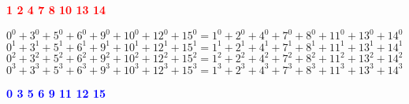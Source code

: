 \documentclass{beamer}
\begin{document}
\begin{frame}
\end{frame}

\begin{frame}
\end{frame}

\begin{frame}
\end{frame}

\begin{frame}
\end{frame}

\begin{frame}

    \begin{center}
    \textcolor{red}{\textbf{1 \hspace{0.5cm} 2 \hspace{0.5cm} 4 \hspace{0.5cm} 7 \hspace{0.5cm} 8 \hspace{0.5cm} 10 \hspace{0.5cm} 13 \hspace{0.5cm} 14}}
    \end{center}
    \vspace{1cm}

    \begin{center}
    $0^0 + 3^0 + 5^0 + 6^0 + 9^0 + 10^0 + 12^0 + 15^0 = 1^0 + 2^0 + 4^0 + 7^0 + 8^0 + 11^0 + 13^0 + 14^0$ \\
    $0^1 + 3^1 + 5^1 + 6^1 + 9^1 + 10^1 + 12^1 + 15^1 = 1^1 + 2^1 + 4^1 + 7^1 + 8^1 + 11^1 + 13^1 + 14^1$ \\
    $0^2 + 3^2 + 5^2 + 6^2 + 9^2 + 10^2 + 12^2 + 15^2 = 1^2 + 2^2 + 4^2 + 7^2 + 8^2 + 11^2 + 13^2 + 14^2$ \\
    $0^3 + 3^3 + 5^3 + 6^3 + 9^3 + 10^3 + 12^3 + 15^3 = 1^3 + 2^3 + 4^3 + 7^3 + 8^3 + 11^3 + 13^3 + 14^3$
    \end{center}

    
    \vfill %
    
    \begin{center}
    \textcolor{blue}{\textbf{0 \hspace{0.5cm} 3 \hspace{0.5cm} 5 \hspace{0.5cm} 6 \hspace{0.5cm} 9 \hspace{0.5cm} 11 \hspace{0.5cm} 12 \hspace{0.5cm} 15}}
    \end{center}

\end{frame}
\end{document}
